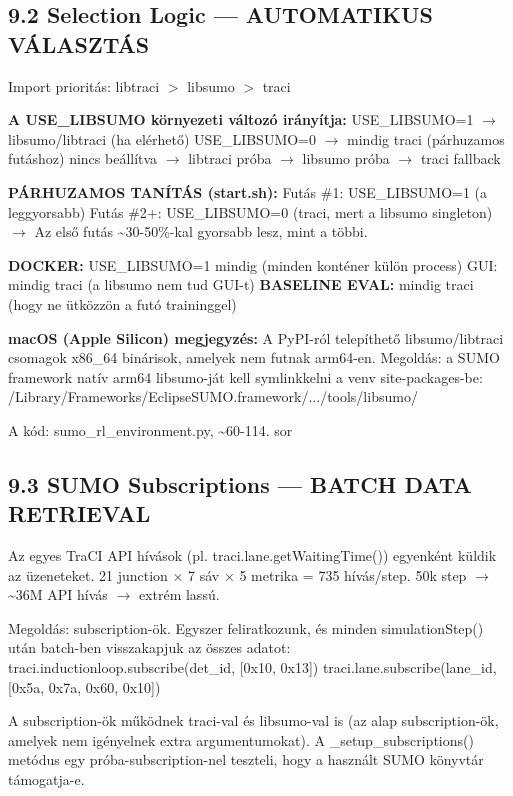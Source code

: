 \documentclass[11pt,a4paper]{article}
\begin{document}
\subsection*{9.2 Selection Logic — AUTOMATIKUS VÁLASZTÁS}
Import prioritás: libtraci $>$ libsumo $>$ traci

\textbf{A USE\_LIBSUMO környezeti változó irányítja:}
USE\_LIBSUMO=1  $\rightarrow$ libsumo/libtraci (ha elérhető)
USE\_LIBSUMO=0  $\rightarrow$ mindig traci (párhuzamos futáshoz)
nincs beállítva $\rightarrow$ libtraci próba $\rightarrow$ libsumo próba $\rightarrow$ traci fallback

\textbf{PÁRHUZAMOS TANÍTÁS (start.sh):}
Futás \#1: USE\_LIBSUMO=1 (a leggyorsabb)
Futás \#2+: USE\_LIBSUMO=0 (traci, mert a libsumo singleton)
$\rightarrow$ Az első futás \textasciitilde{}30-50\%-kal gyorsabb lesz, mint a többi.

\textbf{DOCKER:} USE\_LIBSUMO=1 mindig (minden konténer külön process)
GUI: mindig traci (a libsumo nem tud GUI-t)
\textbf{BASELINE EVAL:} mindig traci (hogy ne ütközzön a futó traininggel)

\textbf{macOS (Apple Silicon) megjegyzés:}
A PyPI-ról telepíthető libsumo/libtraci csomagok x86\_64 binárisok,
amelyek nem futnak arm64-en. Megoldás: a SUMO framework natív
arm64 libsumo-ját kell symlinkkelni a venv site-packages-be:
/Library/Frameworks/EclipseSUMO.framework/.../tools/libsumo/

A kód: sumo\_rl\_environment.py, \textasciitilde{}60-114. sor

\subsection*{9.3 SUMO Subscriptions — BATCH DATA RETRIEVAL}
Az egyes TraCI API hívások (pl. traci.lane.getWaitingTime()) egyenként
küldik az üzeneteket. 21 junction × 7 sáv × 5 metrika = 735 hívás/step.
50k step $\rightarrow$ \textasciitilde{}36M API hívás $\rightarrow$ extrém lassú.

Megoldás: subscription-ök. Egyszer feliratkozunk, és minden simulationStep()
után batch-ben visszakapjuk az összes adatot:
traci.inductionloop.subscribe(det\_id, [0x10, 0x13])
traci.lane.subscribe(lane\_id, [0x5a, 0x7a, 0x60, 0x10])

A subscription-ök működnek traci-val és libsumo-val is (az alap
subscription-ök, amelyek nem igényelnek extra argumentumokat).
A \_setup\_subscriptions() metódus egy próba-subscription-nel teszteli,
hogy a használt SUMO könyvtár támogatja-e.
\end{document}
